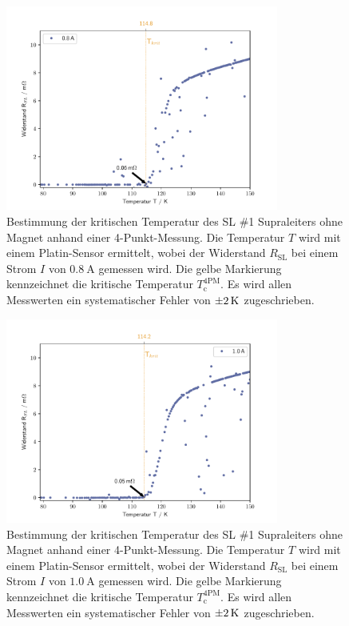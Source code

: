 \begin{figure}[H]
    \centering
    \includegraphics[width=0.8\textwidth]{Auswertung/I_krit_Pt/R_T_0.8A.pdf}
    \caption{Bestimmung der kritischen Temperatur des SL \#1 Supraleiters ohne Magnet
    anhand einer 4-Punkt-Messung. Die Temperatur $T$ wird mit einem Platin-Sensor
    ermittelt, wobei der Widerstand $R_{\text{SL}}$ bei einem Strom $I$ von
    $\SI{0.8}{\ampere}$ gemessen wird.
		Die gelbe Markierung kennzeichnet die kritische Temperatur	$T^{\text{4PM}}_{\text{c}}$.
		Es wird allen Messwerten ein systematischer Fehler von $\SI{\pm2}{\kelvin}$
		zugeschrieben.}
    \label{fig:Tc1.4}
\end{figure}

\begin{figure}[H]
    \centering
    \includegraphics[width=0.8\textwidth]{Auswertung/I_krit_Pt/R_T_1.0A.pdf}
    \caption{Bestimmung der kritischen Temperatur des SL \#1 Supraleiters ohne Magnet
    anhand einer 4-Punkt-Messung. Die Temperatur $T$ wird mit einem Platin-Sensor
    ermittelt, wobei der Widerstand $R_{\text{SL}}$ bei einem Strom $I$ von
    $\SI{1.0}{\ampere}$ gemessen wird.
		Die gelbe Markierung kennzeichnet die kritische Temperatur	$T^{\text{4PM}}_{\text{c}}$.
		Es wird allen Messwerten ein systematischer Fehler von $\SI{\pm2}{\kelvin}$
		zugeschrieben.}
    \label{fig:Tc1.5}
\end{figure}

